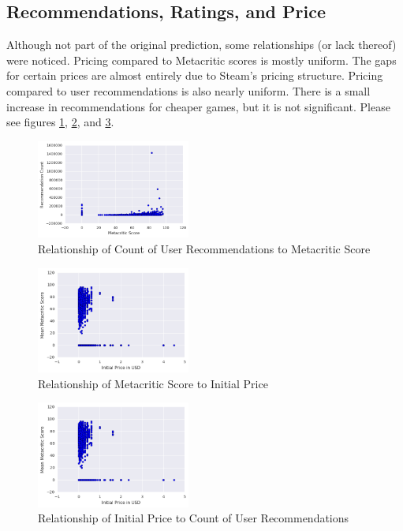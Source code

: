 \documentclass[letterpaper,10pt,twocolumn]{article}
\begin{document}
\subsection{Recommendations, Ratings, and Price}

Although not part of the original prediction, some relationships (or lack
thereof) were noticed. Pricing compared to Metacritic scores is mostly
uniform. The gaps for certain prices are almost entirely due to Steam's
pricing structure. Pricing compared to user recommendations is also nearly
uniform. There is a small increase in recommendations for cheaper games, but
it is not significant. Please see figures
\ref{fig:metacritic-recommendations},
\ref{fig:metacritic-price}, and
\ref{fig:price-recommendations}.

\begin{figure}[H]
    \label{fig:metacritic-recommendations}
    \caption{Relationship of Count of User Recommendations to Metacritic Score}
    \includegraphics[width=0.45\textwidth,keepaspectratio]{metacritic-recommendations-scatter}
\end{figure}

\begin{figure}[H]
    \label{fig:metacritic-price}
    \caption{Relationship of Metacritic Score to Initial Price}
    \includegraphics[width=0.45\textwidth,keepaspectratio]{price-metacritic-scatter}
\end{figure}

\begin{figure}[H]
    \label{fig:price-recommendations}
    \caption{Relationship of Initial Price to Count of User Recommendations}
    \includegraphics[width=0.45\textwidth,keepaspectratio]{price-metacritic-scatter}
\end{figure}
\end{document}
